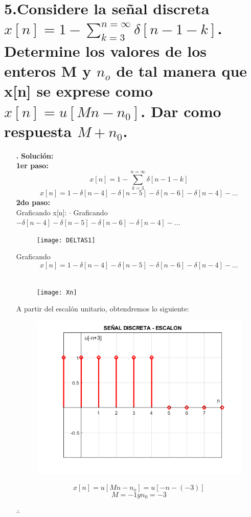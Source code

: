 \documentclass[11pt,a4paper]{article}
\begin{document}
	\section{\textbf{5.Considere la señal discreta $x[n]= 1- \sum_{k=3}^{n=\infty} \delta[n-1-k]$. Determine los valores de los enteros M y $n_o$ de tal manera que x[n] se exprese como $x[n]=u[Mn-n_0]$. Dar como respuesta $M+n_0$.}}{
	\Large{
	\begin{enumerate}
	\item[\textbf{.}]
	\textbf{Solución:}\\
	\textbf{1er paso:} \\
	$$x[n]= 1- \sum_{k=3}^{n=\infty} \delta[n-1-k]$$
	$$x[n]= 1- \delta[n-4]-\delta[n-5]-\delta[n-6]-\delta[n-4]-...$$
	\textbf{2do paso:}\\
	Graficando x[n]:
	$\cdot$ Graficando $- \delta[n-4]-\delta[n-5]-\delta[n-6]-\delta[n-4]-...$
	\begin{center}
	\begin{figure}[h]
	 \centering 
	\texttt{[image: DELTAS1]}
	\label{DELTAS1}
	\end{figure}
	\end{center}
	\newpage
	Graficando $$x[n]= 1- \delta[n-4]-\delta[n-5]-\delta[n-6]-\delta[n-4]-...$$\\
	\begin{center}
	\begin{figure}[h]
	 \centering 
	\texttt{[image: Xn]}
	\label{Xn}
	\end{figure}
	\end{center}
	A partir del escalón unitario, obtendremos lo siguiente:\\
	\begin{center}
	\begin{figure}[h]
	 \centering 
	\includegraphics[scale=0.7]{UNMAS3}
	\label{UNMAS3}
	\end{figure}
	\end{center}
	$$x[n]=u[Mn-n_o]=u[-n-(-3)]$$
	$$M=-1 y n_0=-3$$
	\begin{center}
	$\therefore$ 
	\end{center}
	\end{enumerate}
	}}
\end{document}
